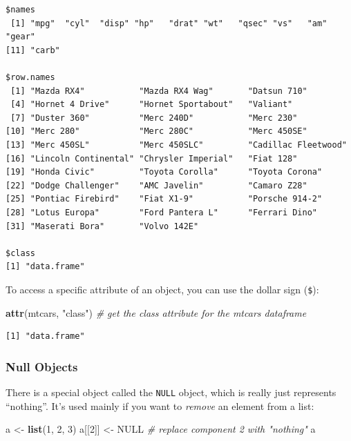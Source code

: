 \documentclass[
]{article}
\newenvironment{Shaded}{\begin{snugshade}}{\end{snugshade}}
\newcommand{\CommentTok}[1]{\textcolor[rgb]{0.56,0.35,0.01}{\textit{#1}}}
\newcommand{\DecValTok}[1]{\textcolor[rgb]{0.00,0.00,0.81}{#1}}
\newcommand{\KeywordTok}[1]{\textcolor[rgb]{0.13,0.29,0.53}{\textbf{#1}}}
\newcommand{\NormalTok}[1]{#1}
\newcommand{\OtherTok}[1]{\textcolor[rgb]{0.56,0.35,0.01}{#1}}
\newcommand{\StringTok}[1]{\textcolor[rgb]{0.31,0.60,0.02}{#1}}
\begin{document}
\begin{verbatim}
$names
 [1] "mpg"  "cyl"  "disp" "hp"   "drat" "wt"   "qsec" "vs"   "am"   "gear"
[11] "carb"

$row.names
 [1] "Mazda RX4"           "Mazda RX4 Wag"       "Datsun 710"         
 [4] "Hornet 4 Drive"      "Hornet Sportabout"   "Valiant"            
 [7] "Duster 360"          "Merc 240D"           "Merc 230"           
[10] "Merc 280"            "Merc 280C"           "Merc 450SE"         
[13] "Merc 450SL"          "Merc 450SLC"         "Cadillac Fleetwood" 
[16] "Lincoln Continental" "Chrysler Imperial"   "Fiat 128"           
[19] "Honda Civic"         "Toyota Corolla"      "Toyota Corona"      
[22] "Dodge Challenger"    "AMC Javelin"         "Camaro Z28"         
[25] "Pontiac Firebird"    "Fiat X1-9"           "Porsche 914-2"      
[28] "Lotus Europa"        "Ford Pantera L"      "Ferrari Dino"       
[31] "Maserati Bora"       "Volvo 142E"         

$class
[1] "data.frame"
\end{verbatim}

To access a specific attribute of an object, you can use the dollar sign (\texttt{\$}):

\begin{Shaded}
\begin{Highlighting}[]
\KeywordTok{attr}\NormalTok{(mtcars, }\StringTok{"class"}\NormalTok{)  }\CommentTok{# get the class attribute for the mtcars dataframe}
\end{Highlighting}
\end{Shaded}

\begin{verbatim}
[1] "data.frame"
\end{verbatim}

\hypertarget{null-objects}{%
\subsubsection{Null Objects}\label{null-objects}}

There is a special object called the \texttt{NULL} object, which is really just represents ``nothing''.
It's used mainly if you want to \emph{remove} an element from a list:

\begin{Shaded}
\begin{Highlighting}[]
\NormalTok{a <-}\StringTok{ }\KeywordTok{list}\NormalTok{(}\DecValTok{1}\NormalTok{, }\DecValTok{2}\NormalTok{, }\DecValTok{3}\NormalTok{)}
\NormalTok{a[[}\DecValTok{2}\NormalTok{]] <-}\StringTok{ }\OtherTok{NULL}   \CommentTok{# replace component 2 with "nothing"}
\NormalTok{a}
\end{Highlighting}
\end{Shaded}
\end{document}
